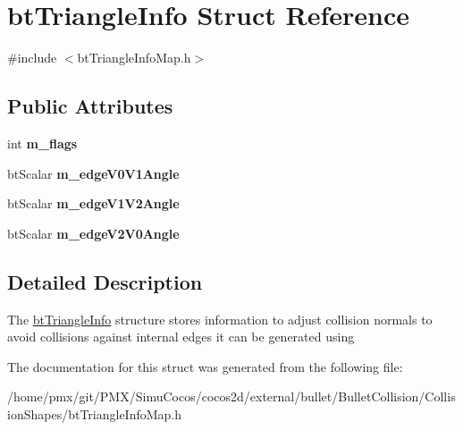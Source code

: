 \hypertarget{structbtTriangleInfo}{}\section{bt\+Triangle\+Info Struct Reference}
\label{structbtTriangleInfo}


{\ttfamily \#include $<$bt\+Triangle\+Info\+Map.\+h$>$}

\subsection*{Public Attributes}
\begin{DoxyCompactItemize}
\item 
\mbox{\label{structbtTriangleInfo_afbd8bd1ca46ae8f3563350dce237655e}} 
int {\bfseries m\+\_\+flags}
\item 
\mbox{\label{structbtTriangleInfo_a92d65aefb4f0c0a376a03d65a9c0606d}} 
bt\+Scalar {\bfseries m\+\_\+edge\+V0\+V1\+Angle}
\item 
\mbox{\label{structbtTriangleInfo_af61bc2624e2aa5ea452c2b962d570436}} 
bt\+Scalar {\bfseries m\+\_\+edge\+V1\+V2\+Angle}
\item 
\mbox{\label{structbtTriangleInfo_a211d59980bc47ab7685b80507e14b1fd}} 
bt\+Scalar {\bfseries m\+\_\+edge\+V2\+V0\+Angle}
\end{DoxyCompactItemize}


\subsection{Detailed Description}
The \hyperlink{structbtTriangleInfo}{bt\+Triangle\+Info} structure stores information to adjust collision normals to avoid collisions against internal edges it can be generated using 

The documentation for this struct was generated from the following file\+:\begin{DoxyCompactItemize}
\item 
/home/pmx/git/\+P\+M\+X/\+Simu\+Cocos/cocos2d/external/bullet/\+Bullet\+Collision/\+Collision\+Shapes/bt\+Triangle\+Info\+Map.\+h\end{DoxyCompactItemize}
